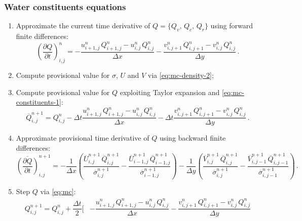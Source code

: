 \documentclass{article}
\numberwithin{equation}{section}
\begin{document}
	\subsubsection{Water constituents equations}
		\begin{enumerate}
			\item Approximate the current time derivative of $Q = \lbrace Q_v, \, Q_c, \, Q_r \rbrace$ using forward finite differences:
				\begin{equation}
					\label{eq:mc-constituents-1}
					\left( \dfrac{\partial Q}{\partial t} \right)_{i,j}^n = - \dfrac{u_{i+1,j}^n \, Q_{i+1,j}^n - u_{i,j}^n \, Q_{i,j}^n}{\Delta x} - \dfrac{v_{i,j+1}^n \, Q_{i,j+1}^n - v_{i,j}^n \, Q_{i,j}^n}{\Delta y} \, .
				\end{equation}
			\item Compute provisional value for $\sigma$, $U$ and $V$ via \eqref{eq:mc-density-2};
			\item Compute provisional value for $Q$ exploiting Taylor expansion and \eqref{eq:mc-constituents-1}:
				\begin{equation}
					\label{eq:mc-constituents-2}
					\overline{Q}_{i,j}^{n+1} = Q_{i,j}^n - \Delta t \dfrac{u_{i+1,j}^n \, Q_{i+1,j}^n - u_{i,j}^n \, Q_{i,j}^n}{\Delta x} -\Delta t \dfrac{v_{i,j+1}^n \, Q_{i,j+1}^n - v_{i,j}^n \, Q_{i,j}^n}{\Delta y} \, .
				\end{equation}
			\item Approximate provisional time derivative of $Q$ using backward finite differences:
				\begin{equation}
					\label{eq:mc-constituents-3}
					\overline{\left( \dfrac{\partial Q}{\partial t} \right)}_{i,j}^{n+1} = - \dfrac{1}{\Delta x} \left( \dfrac{\overline{U}_{i,j}^{n+1} \, \overline{Q}_{i,j}^{n+1}}{\overline{\sigma}_{i,j}^{n+1}} - \dfrac{\overline{U}_{i-1,j}^{n+1} \, \overline{Q}_{i-1,j}^{n+1}}{\overline{\sigma}_{i-1,j}^{n+1}} \right) - \dfrac{1}{\Delta y} \left( \dfrac{\overline{V}_{i,j}^{n+1} \, \overline{Q}_{i,j}^{n+1}}{\overline{\sigma}_{i,j}^{n+1}} - \dfrac{\overline{V}_{i,j-1}^{n+1} \, \overline{Q}_{i,j-1}^{n+1}}{\overline{\sigma}_{i,j-1}^{n+1}} \right) \, .
				\end{equation}
			\item Step $Q$ via \eqref{eq:mc}:
				\begin{equation}
					\label{eq:mc-constituents-4}
					\begin{aligned}
						Q_{i,j}^{n+1} = Q_{i,j}^n + \dfrac{\Delta t}{2} \Biggl[ & - \dfrac{u_{i+1,j}^n \, Q_{i+1,j}^n - u_{i,j}^n \, Q_{i,j}^n}{\Delta x} - \dfrac{v_{i,j+1}^n \, Q_{i,j+1}^n - v_{i,j}^n \, Q_{i,j}^n}{\Delta y} \\

\end{aligned}
\end{equation}
\end{enumerate}
\end{document}
